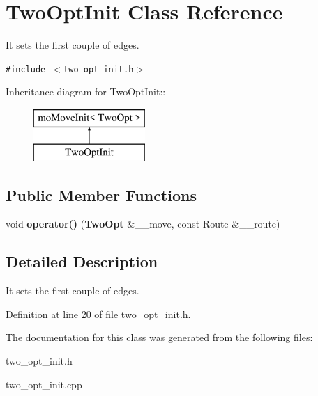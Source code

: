 \section{TwoOptInit Class Reference}
\label{class_two_opt_init}
It sets the first couple of edges.  


{\tt \#include $<$two\_\-opt\_\-init.h$>$}

Inheritance diagram for TwoOptInit::\begin{figure}[H]
\begin{center}
\leavevmode
\includegraphics[height=2cm]{class_two_opt_init}
\end{center}
\end{figure}
\subsection*{Public Member Functions}
\begin{CompactItemize}
\item 
void {\bf operator()} ({\bf TwoOpt} \&\_\-\_\-move, const Route \&\_\-\_\-route)\label{class_two_opt_init_5bf6af064d37ebd955ffb5a623e78e1b}

\end{CompactItemize}


\subsection{Detailed Description}
It sets the first couple of edges. 



Definition at line 20 of file two\_\-opt\_\-init.h.

The documentation for this class was generated from the following files:\begin{CompactItemize}
\item 
two\_\-opt\_\-init.h\item 
two\_\-opt\_\-init.cpp\end{CompactItemize}
